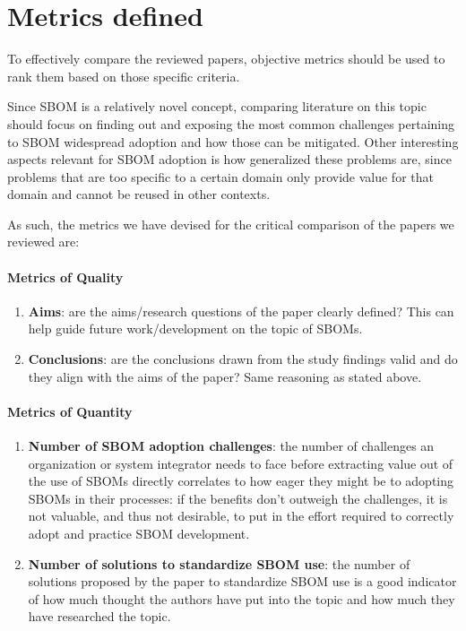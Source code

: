 \section{Metrics defined} \label{metrics}

To effectively compare the reviewed papers, objective metrics should be used to rank them based on those specific criteria.

\noindent Since SBOM is a relatively novel concept, comparing literature on this topic should focus on finding out and exposing the most common challenges pertaining to SBOM widespread adoption and how those can be mitigated. Other interesting aspects relevant for SBOM adoption is how generalized these problems are, since problems that are too specific to a certain domain only provide value for that domain and cannot be reused in other contexts.

\noindent As such, the metrics we have devised for the critical comparison of the papers we reviewed are:

\paragraph{Metrics of Quality}
\begin{enumerate}
    \item \textbf{Aims}: are the aims/research questions of the paper clearly defined? This can help guide future work/development on the topic of SBOMs.
    \item \textbf{Conclusions}: are the conclusions drawn from the study findings valid and do they align with the aims of the paper? Same reasoning as stated above.
          \setcounter{metrics}{\value{enumi}}
\end{enumerate}

\paragraph{Metrics of Quantity}
\begin{enumerate}
    \setcounter{enumi}{\value{metrics}}
    \item \textbf{Number of SBOM adoption challenges}: the number of challenges an organization or system integrator needs to face before extracting value out of the use of SBOMs directly correlates to how eager they might be to adopting SBOMs in their processes: if the benefits don't outweigh the challenges, it is not valuable, and thus not desirable, to put in the effort required to correctly adopt and practice SBOM development.
    \item \textbf{Number of solutions to standardize SBOM use}: the number of solutions proposed by the paper to standardize SBOM use is a good indicator of how much thought the authors have put into the topic and how much they have researched the topic.
          \setcounter{metrics}{\value{enumi}}
\end{enumerate}

